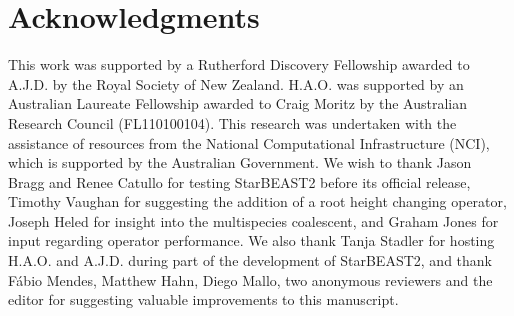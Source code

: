 \documentclass[nogrid]{MBE}%
\begin{document}
\section{Acknowledgments}

This work was supported by a Rutherford Discovery Fellowship awarded to A.J.D.
by the Royal Society of New Zealand. H.A.O. was supported by an Australian
Laureate Fellowship awarded to Craig Moritz by the Australian Research Council
(FL110100104). This research was undertaken with the assistance of resources
from the National Computational Infrastructure (NCI), which is supported by
the Australian Government. We wish to thank Jason Bragg and Renee Catullo for
testing StarBEAST2 before its official release, Timothy Vaughan for suggesting
the addition of a root height changing operator, Joseph Heled for insight into
the multispecies coalescent, and Graham Jones for input regarding operator
performance. We also thank Tanja Stadler for hosting H.A.O. and A.J.D. during
part of the development of StarBEAST2, and thank F\'abio Mendes, Matthew Hahn,
Diego Mallo, two anonymous reviewers and the editor for suggesting valuable
improvements to this manuscript.

\end{document}
